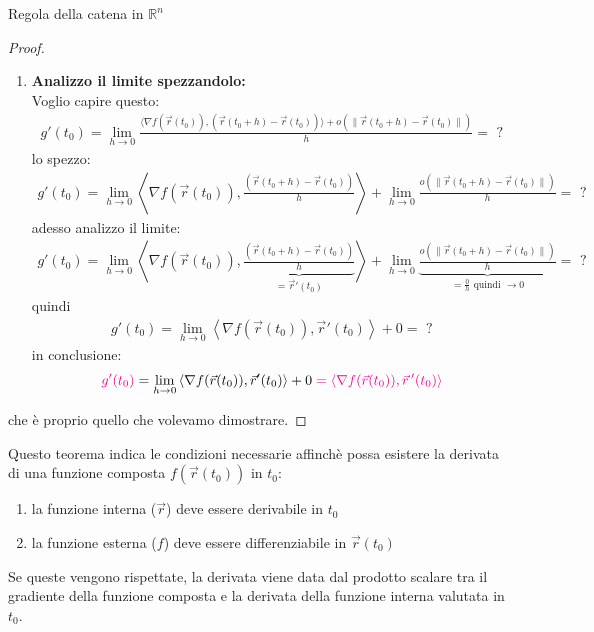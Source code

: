 \documentclass{article}  %
\begin{document}
\begin{theorem}{Regola della catena in $\mathbb{R}^n$}
\begin{proof}
\begin{enumerate}
\begin{align*}
			      \end{align*}
			\item \textbf{Analizzo il limite spezzandolo:} \\
			      Voglio capire questo:
			      \begin{align*}
				      g'(t_0) = \lim_{h \to 0} \frac{\langle \nabla f(\vec{r}(t_0)), (\vec{r}(t_0 +h)-\vec{r}(t_0)) \rangle + o\left( \| \vec{r}(t_0 +h)-\vec{r}(t_0) \| \right)}{h} = \text{ ?}
			      \end{align*}
			      lo spezzo:
			      \begin{align*}
				      g'(t_0) = \lim_{h \to 0} \left\langle \nabla f(\vec{r}(t_0)) , \frac{(\vec{r}(t_0 +h)-\vec{r}(t_0))}{h} \right\rangle + \lim_{h \to 0} \frac{o\left( \| \vec{r}(t_0 +h)-\vec{r}(t_0) \| \right)}{h} = \text{ ?}
			      \end{align*}
			      adesso analizzo il limite:
			      \begin{align*}
				      g'(t_0) = \lim_{h \to 0} \left\langle \nabla f(\vec{r}(t_0)) , \underbrace{\frac{(\vec{r}(t_0 +h)-\vec{r}(t_0))}{h}}_{=\vec{r}'(t_0)} \right\rangle + \lim_{h \to 0} \underbrace{\frac{o\left( \| \vec{r}(t_0 +h)-\vec{r}(t_0) \| \right)}{h}}_{=\frac{0}{h} \text{ quindi } \to 0} = \text{ ?}
			      \end{align*}
			      quindi
			      \begin{align*}
				      {g'(t_0)} = \lim_{h \to 0} \left\langle \nabla f(\vec{r}(t_0)) , \vec{r}'(t_0) \right\rangle + 0 = \text{ ?}
			      \end{align*}
			      in conclusione:
			      \begin{align*}
				      \textcolor{magenta}{g'(t_0)} = \lim_{h \to 0} \left\langle \nabla f(\vec{r}(t_0)) , \vec{r}'(t_0) \right\rangle + 0 \textcolor{magenta}{\; = \left\langle \nabla f(\vec{r}(t_0)) , \vec{r}\,'(t_0) \right\rangle}
			      \end{align*}
		\end{enumerate}
		che è proprio quello che volevamo dimostrare.
	\end{proof}
\end{theorem}
Questo teorema indica le condizioni necessarie affinchè possa esistere la derivata di una funzione composta $f(\vec{r}(t_0))$ in $t_0$:
\begin{enumerate}
	\item la funzione interna ($\vec{r}$) deve essere derivabile in $t_0$
	\item la funzione esterna ($f$) deve essere differenziabile in $\vec{r}(t_0)$
\end{enumerate}
Se queste vengono rispettate, la derivata viene data dal
prodotto scalare tra il gradiente della funzione composta e la derivata della funzione interna valutata in $t_0$.
\end{document}
